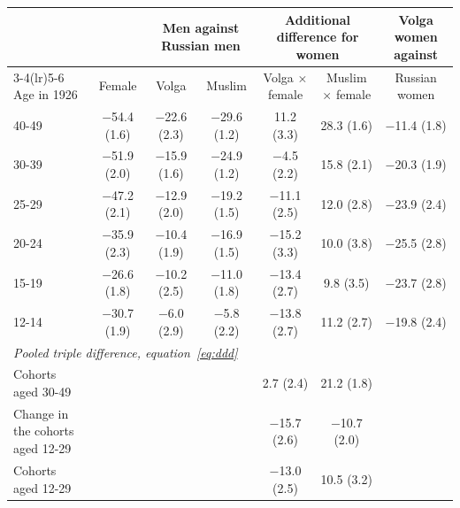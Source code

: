 \begin{tabular}{lcccccc}
\toprule
 & & \multicolumn{2}{c}{Men against Russian men} & \multicolumn{2}{c}{Additional difference for women} & Volga women against \\
\cmidrule(lr){3-4}\cmidrule(lr){5-6}
Age in 1926 & Female & Volga & Muslim & Volga $\times$ female & Muslim $\times$ female & Russian women \\
\midrule
40-49 & $-$54.4 (1.6) & $-$22.6 (2.3) & $-$29.6 (1.2) & 11.2 (3.3) & 28.3 (1.6) & $-$11.4 (1.8) \\
30-39 & $-$51.9 (2.0) & $-$15.9 (1.6) & $-$24.9 (1.2) & $-$4.5 (2.2) & 15.8 (2.1) & $-$20.3 (1.9) \\
25-29 & $-$47.2 (2.1) & $-$12.9 (2.0) & $-$19.2 (1.5) & $-$11.1 (2.5) & 12.0 (2.8) & $-$23.9 (2.4) \\
20-24 & $-$35.9 (2.3) & $-$10.4 (1.9) & $-$16.9 (1.5) & $-$15.2 (3.3) & 10.0 (3.8) & $-$25.5 (2.8) \\
15-19 & $-$26.6 (1.8) & $-$10.2 (2.5) & $-$11.0 (1.8) & $-$13.4 (2.7) & 9.8 (3.5) & $-$23.7 (2.8) \\
12-14 & $-$30.7 (1.9) & $-$6.0 (2.9) & $-$5.8 (2.2) & $-$13.8 (2.7) & 11.2 (2.7) & $-$19.8 (2.4) \\
\midrule
\multicolumn{7}{l}{\textit{Pooled triple difference, equation~\eqref{eq:ddd}}} \\
Cohorts aged 30-49 & & & & 2.7 (2.4) & 21.2 (1.8) & \\
Change in the cohorts aged 12-29 & & & & $-$15.7 (2.6) & $-$10.7 (2.0) & \\
Cohorts aged 12-29 & & & & $-$13.0 (2.5) & 10.5 (3.2) & \\
\bottomrule
\end{tabular}
